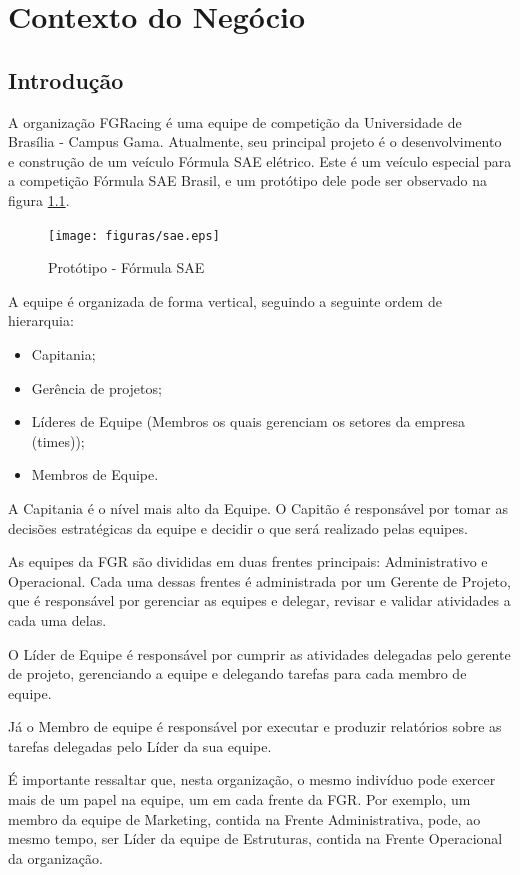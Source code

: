 
\chapter[Contexto do Negócio]{Contexto do Negócio}
\section{Introdução}
A organização FGRacing é uma equipe de competição da Universidade de Brasília -
Campus Gama. Atualmente, seu principal projeto é o desenvolvimento e construção
de um veículo Fórmula SAE elétrico. Este é um veículo especial para a competição
Fórmula SAE Brasil, e um protótipo dele pode ser observado na figura \ref{sae}.

\begin{figure}[!h]
        \centering
        \texttt{[image: figuras/sae.eps]}
        \caption{Protótipo - Fórmula SAE\label{sae}}
\end{figure}

A equipe é organizada de forma vertical, seguindo a seguinte ordem de hierarquia:

\begin{itemize}
  \item Capitania;
  \item Gerência de projetos;
  \item Líderes de Equipe (Membros os quais gerenciam os setores da empresa (times));
  \item Membros de Equipe.
\end{itemize}

A Capitania é o nível mais alto da Equipe. O Capitão é responsável por tomar as decisões estratégicas da equipe e decidir o que será realizado pelas equipes.

As equipes da FGR são divididas em duas frentes principais: Administrativo e Operacional. Cada uma dessas frentes é administrada por um Gerente de Projeto, que é responsável por gerenciar as equipes e delegar, revisar e validar atividades a cada uma delas.

O Líder de Equipe é responsável por cumprir as atividades delegadas pelo gerente de projeto, gerenciando a equipe e delegando tarefas para cada membro de equipe.

Já o Membro de equipe é responsável por executar e produzir relatórios sobre as tarefas delegadas pelo Líder da sua equipe.

É importante ressaltar que, nesta organização, o mesmo indivíduo pode exercer mais de um papel na equipe, um em cada frente da FGR. Por exemplo, um membro da equipe de Marketing, contida na Frente Administrativa, pode, ao mesmo tempo, ser Líder da equipe de Estruturas, contida na Frente Operacional da organização.

